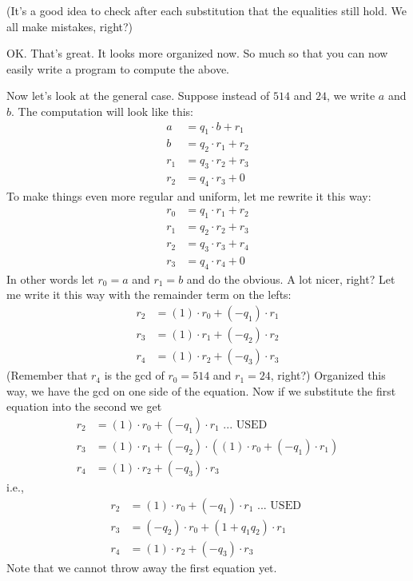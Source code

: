 (It's a good idea to check after each substitution that
the equalities still hold. We all make mistakes, right?)

OK.
That's great.
It looks more organized now.
So much so that you can now easily write a program to compute
the above.


Now let's look at the general case.
Suppose instead of $514$ and $24$, we write $a$ and $b$.
The computation will look like this:
\begin{align*}
a   &= q_1 \cdot b   + r_1 \\
b   &= q_2 \cdot r_1 + r_2 \\
r_1 &= q_3 \cdot r_2 + r_3 \\
r_2 &= q_4 \cdot r_3 + 0
\end{align*}
To make things even more regular and uniform, let me rewrite it this way:
\begin{align*}
r_0 &= q_1 \cdot r_1 + r_2 \\
r_1 &= q_2 \cdot r_2 + r_3 \\
r_2 &= q_3 \cdot r_3 + r_4 \\
r_3 &= q_4 \cdot r_4 + 0
\end{align*}
In other words let $r_0 = a$ and $r_1 = b$ and do the obvious.
A lot nicer, right?
Let me write it this way with the remainder term on the lefts:
\begin{align*}
r_2 &= (1) \cdot r_0 + (-q_1) \cdot r_1 \\
r_3 &= (1) \cdot r_1 + (-q_2) \cdot r_2 \\
r_4 &= (1) \cdot r_2 + (-q_3) \cdot r_3 
\end{align*}
(Remember that $r_4$ is the gcd of $r_0 = 514$ and $r_1 = 24$, right?)
Organized this way, we have the gcd on one side of the equation.
Now if we substitute the first equation into the second we get
\begin{align*}
r_2 &= (1) \cdot r_0 + (-q_1) \cdot r_1 \text{ ... USED }\\
r_3 &= (1) \cdot r_1 + (-q_2) \cdot ((1) \cdot r_0 + (-q_1) \cdot r_1) \\
r_4 &= (1) \cdot r_2 + (-q_3) \cdot r_3 
\end{align*}
i.e.,
\begin{align*}
r_2 &= (1) \cdot r_0 + (-q_1) \cdot r_1 \text{ ... USED }\\
r_3 &= (-q_2) \cdot r_0 + (1 + q_1q_2) \cdot r_1 \\
r_4 &= (1) \cdot r_2 + (-q_3) \cdot r_3  
\end{align*}
Note that we cannot throw away the first equation yet.

